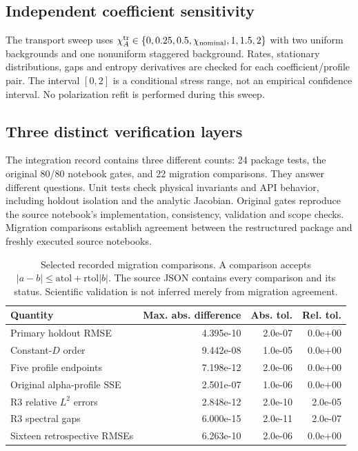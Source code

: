 \documentclass[11pt,a4paper]{article}
\newcommand{\MigrationChecks}{22}
\newcommand{\OriginalAuditPassed}{80}
\begin{document}
\subsection{Independent coefficient sensitivity}

The transport sweep uses $\chi_A^{\rm tr}\in\{0,0.25,0.5,\chi_{\rm nominal},1,1.5,2\}$ with two uniform backgrounds and one nonuniform staggered background. Rates, stationary distributions, gaps and entropy derivatives are checked for each coefficient/profile pair. The interval $[0,2]$ is a conditional stress range, not an empirical confidence interval. No polarization refit is performed during this sweep.

\subsection{Three distinct verification layers}

The integration record contains three different counts: 24 package tests, the original \OriginalAuditPassed/80 notebook gates, and \MigrationChecks{} migration comparisons. They answer different questions. Unit tests check physical invariants and API behavior, including holdout isolation and the analytic Jacobian. Original gates reproduce the source notebook's implementation, consistency, validation and scope checks. Migration comparisons establish agreement between the restructured package and freshly executed source notebooks.

\begin{table}[htbp]\centering\small
\caption{Selected recorded migration comparisons. A comparison accepts $|a-b|\leq\mathrm{atol}+\mathrm{rtol}|b|$. The source JSON contains every comparison and its status. Scientific validation is not inferred merely from migration agreement.}
\label{tab:migration}
\begin{tabular}{lrrr}
\toprule
Quantity & Max. abs. difference & Abs. tol. & Rel. tol. \\
\midrule
Primary holdout RMSE & 4.395e-10 & 2.0e-07 & 0.0e+00 \\
Constant-$D$ order & 9.442e-08 & 1.0e-05 & 0.0e+00 \\
Five profile endpoints & 7.198e-12 & 2.0e-06 & 0.0e+00 \\
Original alpha-profile SSE & 2.501e-07 & 1.0e-06 & 0.0e+00 \\
R3 relative $L^2$ errors & 2.848e-12 & 2.0e-10 & 2.0e-05 \\
R3 spectral gaps & 6.000e-15 & 2.0e-11 & 2.0e-07 \\
Sixteen retrospective RMSEs & 6.263e-10 & 2.0e-06 & 0.0e+00 \\
\bottomrule
\end{tabular}
\end{table}
\end{document}
